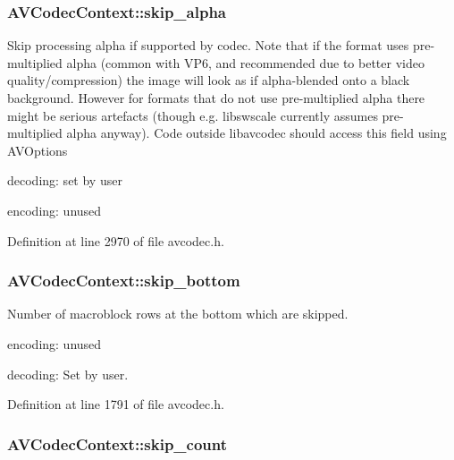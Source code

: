 \subsubsection[{\texorpdfstring{skip\+\_\+alpha}{skip_alpha}}]{ A\+V\+Codec\+Context\+::skip\+\_\+alpha}\hypertarget{struct_a_v_codec_context_a9fca29999231cacbaf1d4754d9a74997}{}\label{struct_a_v_codec_context_a9fca29999231cacbaf1d4754d9a74997}
Skip processing alpha if supported by codec. Note that if the format uses pre-\/multiplied alpha (common with V\+P6, and recommended due to better video quality/compression) the image will look as if alpha-\/blended onto a black background. However for formats that do not use pre-\/multiplied alpha there might be serious artefacts (though e.\+g. libswscale currently assumes pre-\/multiplied alpha anyway). Code outside libavcodec should access this field using A\+V\+Options


\begin{DoxyItemize}
\item decoding\+: set by user
\item encoding\+: unused 
\end{DoxyItemize}

Definition at line 2970 of file avcodec.\+h.

\subsubsection[{\texorpdfstring{skip\+\_\+bottom}{skip_bottom}}]{ A\+V\+Codec\+Context\+::skip\+\_\+bottom}\hypertarget{struct_a_v_codec_context_ae39075ccc5ac22a20d315259e8ad8458}{}\label{struct_a_v_codec_context_ae39075ccc5ac22a20d315259e8ad8458}
Number of macroblock rows at the bottom which are skipped.
\begin{DoxyItemize}
\item encoding\+: unused
\item decoding\+: Set by user. 
\end{DoxyItemize}

Definition at line 1791 of file avcodec.\+h.

\subsubsection[{\texorpdfstring{skip\+\_\+count}{skip_count}}]{ A\+V\+Codec\+Context\+::skip\+\_\+count}\hypertarget{struct_a_v_codec_context_a801dcbc834a3afae4b98053b56855a98}{}\label{struct_a_v_codec_context_a801dcbc834a3afae4b98053b56855a98}


